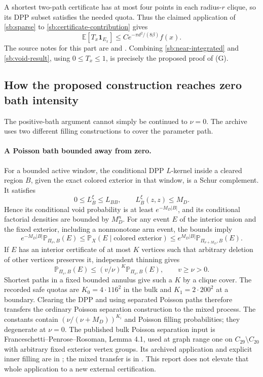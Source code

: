 \documentclass[11pt,a4paper]{article}
\theoremstyle{definition}
\theoremstyle{remark}
\numberwithin{equation}{section}
\begin{document}
A shortest two-path certificate has at most four points in each
radius-$r$ clique, so its DPP subset satisfies the needed quota. Thus
the claimed application of \eqref{sb:sparse} to
\eqref{sb:certificate-contribution} gives
\begin{equation}
 \mathbb E[T_x\mathbf1_{E_x}]
   \le C e^{-\pi d^2/(8\beta)}f(x).
 \label{sb:void-result}
\end{equation}
The source notes for this part are
 and
. Combining
\eqref{sb:near-integrated} and \eqref{sb:void-result}, using
$0\le T_x\le1$, is precisely the proposed proof of (G).

\subsection{How the proposed construction reaches zero bath intensity}

The positive-bath argument cannot simply be continued to $\nu=0$.
The archive uses two different filling constructions to cover the
parameter path.

\paragraph{A Poisson bath bounded away from zero.}
For a bounded active window, the conditional DPP $L$-kernel inside a
cleared region $B$, given the exact colored exterior in that window,
is a Schur complement. It satisfies
\[
 0\le L_B^\xi\le L_{BB},\qquad L_B^\xi(z,z)\le M_D.
\]
Hence its conditional void probability is at least
$e^{-M_D|B|}$, and its conditional factorial densities are bounded by
$M_D^n$. For any event $E$ of the interior union and the fixed exterior,
including a nonmonotone arm event, the bounds imply
\begin{equation}
 e^{-M_D|B|}\mathbb P_{\Pi_\nu,B}(E)
 \le\mathbb P_X(E\mid\text{colored exterior})
 \le e^{M_D|B|}\mathbb P_{\Pi_{\nu+M_D},B}(E).
 \label{sb:poisson-transfer}
\end{equation}
If $E$ has an interior certificate of at most $K$ vertices such that
arbitrary deletion of other vertices preserves it, independent thinning
gives
\[
 \mathbb P_{\Pi_v,B}(E)\le(v/\nu)^K
                     \mathbb P_{\Pi_\nu,B}(E),\qquad v\ge\nu>0.
\]
Shortest paths in a fixed bounded annulus give such a $K$ by a clique
cover. The recorded safe quotas are $K_0=4\cdot116^2$ in the bulk and
$K_1=2\cdot200^2$ at a boundary. Clearing the DPP and using separated
Poisson paths therefore transfers the ordinary Poisson separation
construction to the mixed process. The constants contain
$(\nu/(\nu+M_D))^{K_i}$ and Poisson filling probabilities; they
degenerate at $\nu=0$. The published bulk Poisson separation input is
Franceschetti--Penrose--Rosoman, Lemma 4.1, used at graph range one on
$C_{29}\setminus C_{20}$ with arbitrary fixed exterior vertex groups.
Its archived application and explicit inner filling are in
; the mixed transfer is in
. This report does not elevate that
whole application to a new external certification.
\end{document}
